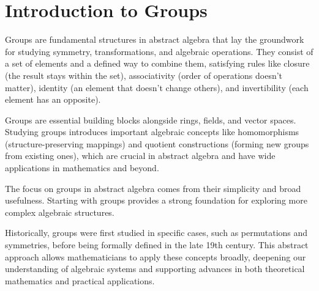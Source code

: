 \chapter{Introduction to Groups}
Groups are fundamental structures in abstract algebra that lay the groundwork for studying symmetry, transformations, and algebraic operations. They consist of a set of elements and a defined way to combine them, satisfying rules like closure (the result stays within the set), associativity (order of operations doesn't matter), identity (an element that doesn't change others), and invertibility (each element has an opposite).

Groups are essential building blocks alongside rings, fields, and vector spaces. Studying groups introduces important algebraic concepts like homomorphisms (structure-preserving mappings) and quotient constructions (forming new groups from existing ones), which are crucial in abstract algebra and have wide applications in mathematics and beyond.

The focus on groups in abstract algebra comes from their simplicity and broad usefulness. Starting with groups provides a strong foundation for exploring more complex algebraic structures. 

Historically, groups were first studied in specific cases, such as permutations and symmetries, before being formally defined in the late 19th century. This abstract approach allows mathematicians to apply these concepts broadly, deepening our understanding of algebraic systems and supporting advances in both theoretical mathematics and practical applications.

